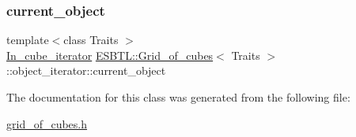 \mbox{\label{classESBTL_1_1Grid__of__cubes_1_1object__iterator_a80eb9046339bde86d3978c55f3578d5f}} 
\subsubsection{\texorpdfstring{current\+\_\+object}{current\_object}}
{\footnotesize\ttfamily template$<$class Traits $>$ \\
\hyperlink{structESBTL_1_1Grid__of__cubes_a1586dac85e561a73b591da3cf07a47b1}{In\+\_\+cube\+\_\+iterator} \hyperlink{structESBTL_1_1Grid__of__cubes}{E\+S\+B\+T\+L\+::\+Grid\+\_\+of\+\_\+cubes}$<$ Traits $>$\+::object\+\_\+iterator\+::current\+\_\+object\hspace{0.3cm}{\ttfamily [protected]}}



The documentation for this class was generated from the following file\+:\begin{DoxyCompactItemize}
\item 
\hyperlink{grid__of__cubes_8h}{grid\+\_\+of\+\_\+cubes.\+h}\end{DoxyCompactItemize}
